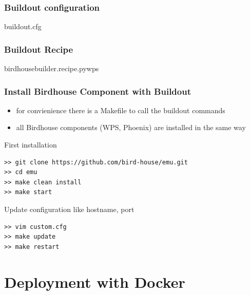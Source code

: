 \documentclass{beamer}
\begin{document}

  \begin{frame}[fragile]
    \frametitle{Buildout configuration}
    \begin{block}{buildout.cfg}
      
    \end{block}
\end{frame}


  \begin{frame}[fragile]
    \frametitle{Buildout Recipe}
    \begin{block}{birdhousebuilder.recipe.pywps}
      
    \end{block}
\end{frame}


  \begin{frame}[fragile]
    \frametitle{Install Birdhouse Component with Buildout}
    \begin{itemize}
      \item for convienience there is a Makefile to call the buildout commands
      \item all Birdhouse components (WPS, Phoenix) are installed in the same way
    \end{itemize}
    \begin{block}{First installation}
      \begin{verbatim}
>> git clone https://github.com/bird-house/emu.git  
>> cd emu
>> make clean install
>> make start
      \end{verbatim}
    \end{block}
\begin{block}{Update configuration like hostname, port}
      \begin{verbatim}
>> vim custom.cfg   
>> make update
>> make restart
      \end{verbatim}
    \end{block}
\end{frame}

  \section{Deployment with Docker}

\end{document}
